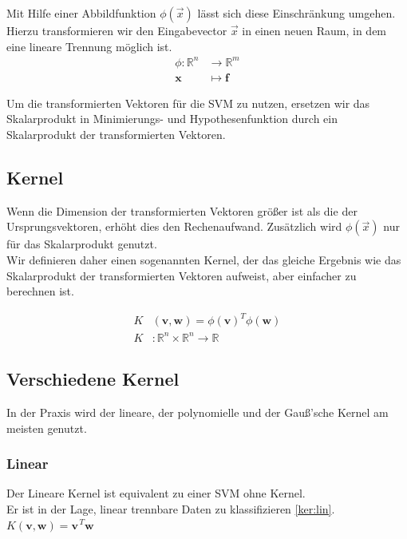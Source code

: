\documentclass[10pt,a4paper]{scrartcl}
\begin{document}
                Mit Hilfe einer Abbildfunktion $\phi(\vec{x})$ lässt sich diese Einschränkung umgehen. Hierzu transformieren wir den Eingabevector $\vec{x}$ in einen neuen Raum, in dem eine lineare Trennung möglich ist. \\
                
                \begin{align*}
                    \phi: \mathbb{R}^{n} & \to \mathbb{R}^{m} \\
                    \boldsymbol{x} & \mapsto \boldsymbol{f}
                \end{align*}
                
                Um die transformierten Vektoren für die SVM zu nutzen, ersetzen wir das Skalarprodukt in Minimierungs- und Hypothesenfunktion durch ein Skalarprodukt der transformierten Vektoren. \\
                
            \subsection{Kernel}
                Wenn die Dimension der transformierten Vektoren größer ist als die der Ursprungsvektoren, erhöht dies den Rechenaufwand.
                Zusätzlich wird $\phi(\vec{x})$ nur für das Skalarprodukt genutzt. \\
                
                Wir definieren daher einen sogenannten Kernel, der das gleiche Ergebnis wie das Skalarprodukt der transformierten Vektoren aufweist, aber einfacher zu berechnen ist.
                
                \begin{align*}
                    K&(\boldsymbol{v}, \boldsymbol{w}) = \phi(\boldsymbol{v})^{T} \phi(\boldsymbol{w})\\
                    K&: \mathbb{R}^n \times \mathbb{R}^n \rightarrow \mathbb{R}
                \end{align*}
                
            \subsection{Verschiedene Kernel}
                In der Praxis wird der lineare, der polynomielle und der Gauß'sche Kernel am meisten genutzt.
                \subsubsection{Linear}
                    Der Lineare Kernel ist equivalent zu einer SVM ohne Kernel. \\
                    Er ist in der Lage, linear trennbare Daten zu klassifizieren \ref{ker:lin}. \\
                    $K(\boldsymbol{v}, \boldsymbol{w}) = \boldsymbol{v}^{\, T} \boldsymbol{w}$
                
\end{document}

